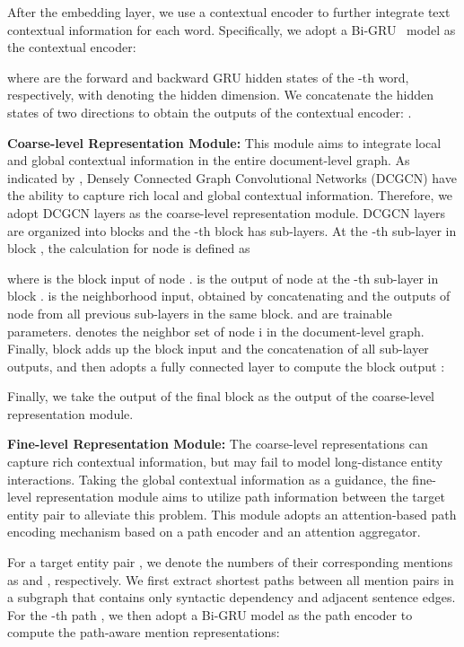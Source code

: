 \documentclass[letterpaper]{article} \usepackage{aaai21}  \usepackage{times}  \usepackage{helvet} \usepackage{courier}  \usepackage[hyphens]{url}  \usepackage{graphicx} \urlstyle{rm} \def\UrlFont{\rm}  \usepackage{natbib}  \usepackage{caption} \frenchspacing  \setlength{\pdfpagewidth}{8.5in}  \setlength{\pdfpageheight}{11in}
\begin{document}
After the embedding layer, we use a contextual encoder to further integrate text contextual information for each word. 
Specifically, we adopt a Bi-GRU~\citep{gru,bi_rnn} model as the contextual encoder: 

where  are the forward and backward GRU hidden states of the -th word, respectively, with  denoting the hidden dimension. 
We concatenate the hidden states of two directions to obtain the outputs of the contextual encoder: . 

\noindent\textbf{Coarse-level Representation Module:} 
This module aims to integrate local and global contextual information in the entire document-level graph. 
As indicated by \citet{dcgcn}, Densely Connected Graph Convolutional Networks (DCGCN) have the ability to capture rich local and global contextual information. 
Therefore, we adopt DCGCN layers as the coarse-level representation module. 
DCGCN layers are organized into  blocks and the -th block has  sub-layers. 
At the -th sub-layer in block , the calculation for node  is defined as 

where  is the block input of node . 
 is the output of node  at the -th sub-layer in block . 
 is the neighborhood input, obtained by concatenating  and the outputs of node  from all previous sub-layers in the same block. 
 and  are trainable parameters. 
 denotes the neighbor set of node i in the document-level graph. 
Finally, block  adds up the block input and the concatenation of all sub-layer outputs, and then adopts a fully connected layer to compute the block output : 

Finally, we take the output of the final block  as the output of the coarse-level representation module. 

\noindent\textbf{Fine-level Representation Module:} 
The coarse-level representations can capture rich contextual information, but may fail to model long-distance entity interactions. 
Taking the global contextual information as a guidance, the fine-level representation module aims to utilize path information between the target entity pair to alleviate this problem. 
This module adopts an attention-based path encoding mechanism based on a path encoder and an attention aggregator. 

For a target entity pair , we denote the numbers of their corresponding mentions as  and , respectively. 
We first extract  shortest paths between all mention pairs in a subgraph that contains only syntactic dependency and adjacent sentence edges. 
For the -th path ,  we then adopt a Bi-GRU model as the path encoder to compute the path-aware mention representations: 
\end{document}
